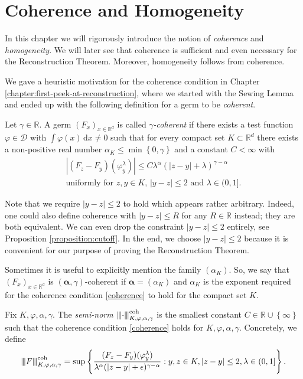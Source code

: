 \section{Coherence and Homogeneity}\label{chapter:coherence}

In this chapter we will rigorously introduce the notion of \emph{coherence} and \emph{homogeneity}. We will later see that coherence is sufficient and even necessary for the Reconstruction Theorem. Moreover, homogeneity follows from coherence.

We gave a heuristic motivation for the coherence condition in Chapter \ref{chapter:first-peek-at-reconstruction}, where we started with the Sewing Lemma and ended up with the following definition for a germ to be \emph{coherent}.

\begin{definition}\label{definition:coherence}
   Let $\gamma \in \mathbb{R}$. A germ $(F_x)_{x \in \mathbb{R}^d}$ is called \emph{$\gamma$-coherent} if there exists a test function $\varphi \in \mathcal{D}$ with $\int \varphi(x) \, \mathrm{d}x \neq 0$ such that for every compact set $K \subset \mathbb{R}^d$ there exists a non-positive real number $\alpha_K \leq \min\left\{ 0, \gamma \right\}$ and a constant $C < \infty$ with
   \begin{gather}\label{coherence}
        |(F_z - F_y)(\varphi^\lambda_y)| \leq C\lambda^\alpha(|z-y| + \lambda)^{\gamma - \alpha}  \\ \text{uniformly for $z,y \in K$, $|y-z| \leq 2$  and $\lambda \in (0,1]$} \nonumber.
   \end{gather}
\end{definition}
Note that we require $|y-z| \leq 2$ to hold which appears rather arbitrary. Indeed, one could also define coherence with $|y-z| \leq R$ for any $R \in \mathbb{R}$ instead; they are both equivalent. We can even drop the constraint $|y-z| \leq 2$ entirely, see Proposition \ref{proposition:cutoff}. In the end, we choose $|y-z| \leq 2$ because it is convenient for our purpose of proving the Reconstruction Theorem.

Sometimes it is useful to explicitly mention the family $(\alpha_K)$. So, we say that  $(F_x)_{x \in \mathbb{R}^d}$ is $(\bm{\alpha}, \gamma)$-coherent if $\bm \alpha = (\alpha_K)$ and $\alpha_K$ is the exponent required for the coherence condition \eqref{coherence} to hold for the compact set $K$. 

Fix $K, \varphi, \alpha, \gamma$. The \emph{semi-norm ${\left\vert\kern-0.25ex\left\vert\kern-0.25ex\left\vert \cdot \right\vert\kern-0.25ex\right\vert\kern-0.25ex\right\vert}^{\mathrm{coh}}_{K,\varphi,\alpha,\gamma}$} is the smallest constant $C \in \mathbb{R} \cup \left\{ \infty \right\}$ such that the coherence condition \eqref{coherence} holds for $K, \varphi, \alpha, \gamma$. Concretely, we define
\begin{align*}
    {\left\vert\kern-0.25ex\left\vert\kern-0.25ex\left\vert F \right\vert\kern-0.25ex\right\vert\kern-0.25ex\right\vert}^{\mathrm{coh}}_{K,\varphi,\alpha,\gamma} = \sup \left\{ \frac{(F_z - F_y)(\varphi^\lambda_y)}{\lambda^\alpha(|z-y| + \epsilon)^{\gamma - \alpha}} : y,z \in K, |z-y| \leq 2, \lambda \in (0,1] \right\}.
\end{align*}

